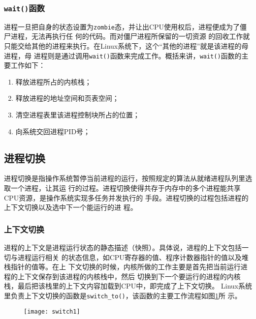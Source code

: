 \documentclass{swfuthesism}
\begin{document}
\subsubsection{\texttt{wait()}函数}

进程一旦把自身的状态设置为\texttt{zombie}态，并让出CPU使用权后，进程便成为了僵尸进程，无法再执行任
何的代码。而对僵尸进程所保留的一切资源
的回收工作就只能交给其他的进程来执行。在Linux系统下，这个“其他的进程”就是该进程的母进程，母
进程则是通过调用\texttt{wait()}函数来完成工作。概括来讲，\texttt{wait()}函数的主要工作如下：
\begin{enumerate}
\item 释放进程所占的内核栈；
\item 释放进程的地址空间和页表空间；
\item 清空进程表里该进程控制块所占的位置；
\item 向系统交回进程PID号；
\end{enumerate}

\subsection{进程切换}

进程切换是指操作系统暂停当前进程的运行，按照规定的算法从就绪进程队列里选取一个进程，让其运
行的过程。进程切换使得共存于内存中的多个进程能共享CPU资源，是操作系统实现多任务并发执行的
手段\cite{tanenbaum2008modern}。进程切换的过程包括进程的上下文切换以及选中下一个能运行的进
程。

\subsubsection{上下文切换}

进程的上下文是进程运行状态的静态描述（快照）。具体说，进程的上下文包括一切与进程运行相关
的状态信息，如CPU寄存器的值、程序计数器指针的值以及堆栈指针的值等\cite{wiki:ctxtSwtch}。在上
下文切换的时候，内核所做的工作主要是首先把当前运行进程的上下文保存到该进程的内核栈中，然后
切换到下一个要运行的进程的内核栈，最后把该栈里的上下文内容加载到CPU中，即完成了上下文切换。
Linux系统里负责上下文切换的函数是\texttt{switch\_to()}，该函数的主要工作流程如图\ref{fig:switch1}所
示。

\begin{figure}
  \centering
  \texttt{[image: switch1]}
  \label{fig:switch1}
\end{figure}
\end{document}
